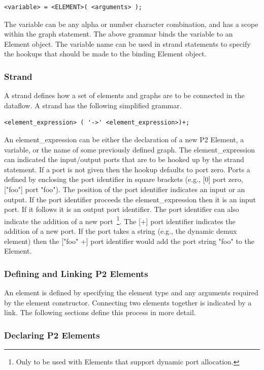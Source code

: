 \documentclass{article}
\begin{document}
\begin{verbatim}
<variable> = <ELEMENT>( <arguments> );
\end{verbatim}

The variable can be any alpha or number character combination, and has a scope
within the graph statement. The above grammar binds the variable
to an Element object. The variable name can be used in strand statements to
specify the hookups that should be made to the binding Element object.

\subsubsection{Strand}
A strand defines how a set of elements and graphs are to be connected in the 
dataflow. A strand has the following simplified grammar. 

\begin{verbatim}
<element_expression> ( '->' <element_expression>)+;
\end{verbatim}

An element\_expression can be either the declaration of a new P2 Element, a 
variable, or the name of some previously defined graph.
The element\_expression can indicated the input/output ports that
are to be hooked up by the strand statement. If a port is not given then the hookup defaults to port zero. Ports a defined by enclosing the port identifier in square
brackets (e.g., [0] port zero, ["foo"] port "foo"). The position of the port identifier
indicates an input or an output. If the port identifier proceeds the element\_expression
then it is an input port. If it follows it is an output port identifier. The port identifier can
also indicate the addition of a new port~\footnote{Only to be used with Elements that
support dynamic port allocation.}. The [+] port identifier indicates the addition of a 
new port. If the port takes a string (e.g., the dynamic demux element) then 
the ["foo" +] port identifier would add the port string "foo" to the Element.


\subsubsection{Defining and Linking P2 Elements}
An element is defined by specifying the element type and any arguments required 
by the element constructor. Connecting two elements together is indicated by a link. 
The following sections define this process in more detail.

\subsubsection{Declaring P2 Elements}
\end{document}
